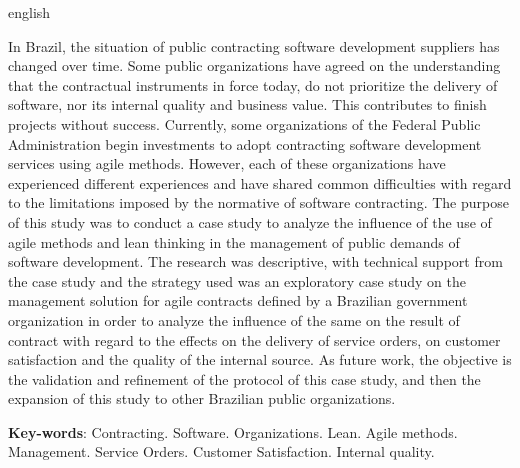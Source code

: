 \begin{resumo}[Abstract]
 \begin{otherlanguage*}{english}
 
In Brazil, the situation of public contracting software development suppliers has changed over time. Some public organizations have agreed on the understanding that the contractual instruments in force today, do not prioritize the delivery of software, nor its internal quality and business value. This contributes to finish projects without success. Currently, some organizations of the Federal Public Administration begin investments  to adopt contracting software development services using agile methods. However, each of these organizations have experienced different experiences and have shared common difficulties with regard to the limitations imposed by the normative of software contracting. The purpose of this study was to conduct a case study to analyze the influence of the use of agile methods and lean thinking in the management of public demands of software development. The research was descriptive, with technical support from the case study and the strategy used was an exploratory case study on the management solution for agile contracts defined by a Brazilian government organization in order to analyze the influence of the same on the result of contract with regard to the effects on the delivery of service orders, on customer satisfaction and the quality of the internal source. As future work, the objective is the validation and refinement of the protocol of this case study, and then the expansion of this study to other Brazilian public organizations.

   \vspace{\onelineskip}
 
   \noindent 
   \textbf{Key-words}:  Contracting. Software. Organizations. Lean. Agile methods. Management. Service Orders. Customer Satisfaction. Internal quality.
 \end{otherlanguage*}
\end{resumo}
